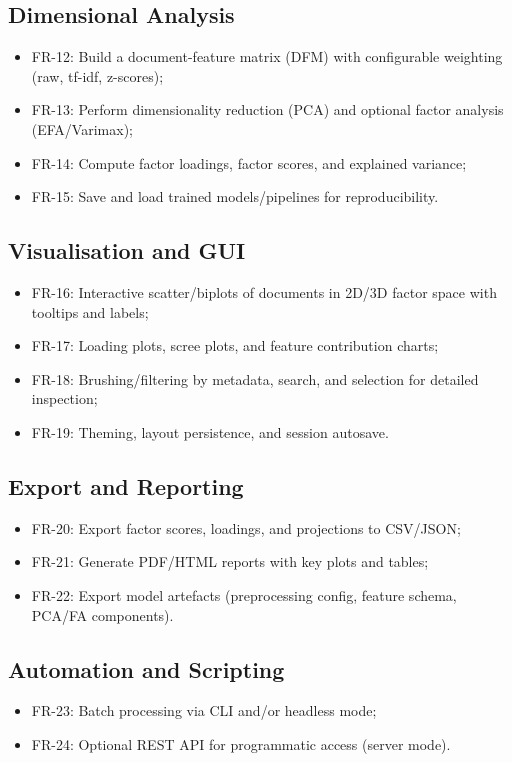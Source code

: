 \subsection{Dimensional Analysis}
\begin{itemize}
    \item FR-12: Build a document-feature matrix (DFM) with configurable weighting (raw, tf-idf, z-scores);
    \item FR-13: Perform dimensionality reduction (PCA) and optional factor analysis (EFA/Varimax);
    \item FR-14: Compute factor loadings, factor scores, and explained variance;
    \item FR-15: Save and load trained models/pipelines for reproducibility.
\end{itemize}

\subsection{Visualisation and GUI}
\begin{itemize}
    \item FR-16: Interactive scatter/biplots of documents in 2D/3D factor space with tooltips and labels;
    \item FR-17: Loading plots, scree plots, and feature contribution charts;
    \item FR-18: Brushing/filtering by metadata, search, and selection for detailed inspection;
    \item FR-19: Theming, layout persistence, and session autosave.
\end{itemize}

\subsection{Export and Reporting}
\begin{itemize}
    \item FR-20: Export factor scores, loadings, and projections to CSV/JSON;
    \item FR-21: Generate PDF/HTML reports with key plots and tables;
    \item FR-22: Export model artefacts (preprocessing config, feature schema, PCA/FA components).
\end{itemize}

\subsection{Automation and Scripting}
\begin{itemize}
    \item FR-23: Batch processing via CLI and/or headless mode;
    \item FR-24: Optional REST API for programmatic access (server mode).
\end{itemize}

